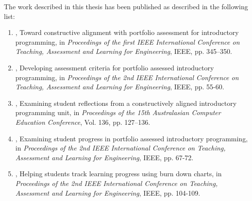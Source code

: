 The work described in this thesis has been published as described in the following list:
\begin{enumerate}
	\item \citet{Cain:2012a}, Toward constructive alignment with portfolio assessment for introductory programming, in \emph{Proceedings of the first IEEE International Conference on Teaching, Assessment and Learning for Engineering}, IEEE, pp. 345–350.

	\item \citet{Cain:2013c}, Developing assessment criteria for portfolio assessed introductory programming, in \emph{Proceedings of the 2nd IEEE International Conference on Teaching, Assessment and Learning for Engineering}, IEEE, pp. 55-60.

	\item \citet{Cain:2013a}, Examining student reflections from a constructively aligned introductory programming unit, in \emph{Proceedings of the 15th Australasian Computer Education Conference}, Vol. 136, pp. 127–136.

	\item \citet{Cain:2013b}, Examining student progress in portfolio assessed introductory programming, in \emph{Proceedings of the 2nd IEEE International Conference on Teaching, Assessment and Learning for Engineering}, IEEE, pp. 67-72.

	\item \citet{Woodward:2013}, Helping students track learning progress using burn down charts, in \emph{Proceedings of the 2nd IEEE International Conference on Teaching, Assessment and Learning for Engineering}, IEEE, pp. 104-109.

\end{enumerate}



